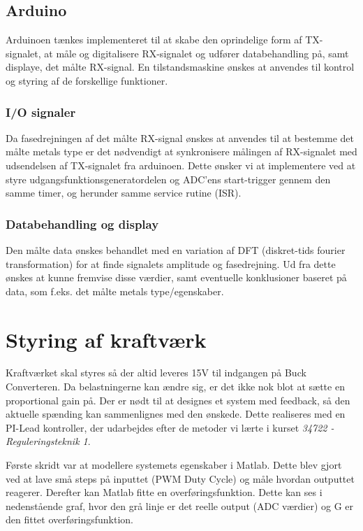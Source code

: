 \documentclass[../main.tex]{subfiles}
\begin{document}
\subsection{Arduino}
Arduinoen tænkes implementeret til at skabe den oprindelige form af TX-signalet, at måle og digitalisere RX-signalet og udfører databehandling på, samt displaye, det målte RX-signal.
En tilstandsmaskine ønskes at anvendes til kontrol og styring af de forskellige funktioner.

\subsubsection{I/O signaler}
Da fasedrejningen af det målte RX-signal ønskes at anvendes til at bestemme det målte metals type er det nødvendigt at synkronisere målingen af RX-signalet med udsendelsen af TX-signalet fra arduinoen. Dette ønsker vi at implementere ved at styre udgangsfunktionsgeneratordelen og ADC'ens start-trigger gennem den samme timer, og herunder samme service rutine (ISR).

\subsubsection{Databehandling og display}
Den målte data ønskes behandlet med en variation af DFT (diskret-tids fourier transformation) for at finde signalets amplitude og fasedrejning. Ud fra dette ønskes at kunne fremvise disse værdier, samt eventuelle konklusioner baseret på data, som f.eks. det målte metals type/egenskaber.

\section{Styring af kraftværk}
Kraftværket skal styres så der altid leveres 15V til indgangen på Buck Converteren. Da belastningerne kan ændre sig, er det ikke nok blot at sætte en proportional gain på. Der er nødt til at designes et system med feedback, så den aktuelle spænding kan sammenlignes med den ønskede. Dette realiseres med en PI-Lead kontroller, der udarbejdes efter de metoder vi lærte i kurset \emph{34722 - Reguleringsteknik 1}.

Første skridt var at modellere systemets egenskaber i Matlab. Dette blev gjort ved at lave små steps på inputtet (PWM Duty Cycle) og måle hvordan outputtet reagerer. Derefter kan Matlab fitte en overføringsfunktion. Dette kan ses i nedenstående graf, hvor den grå linje er det reelle output (ADC værdier) og G er den fittet overføringsfunktion.
\end{document}
